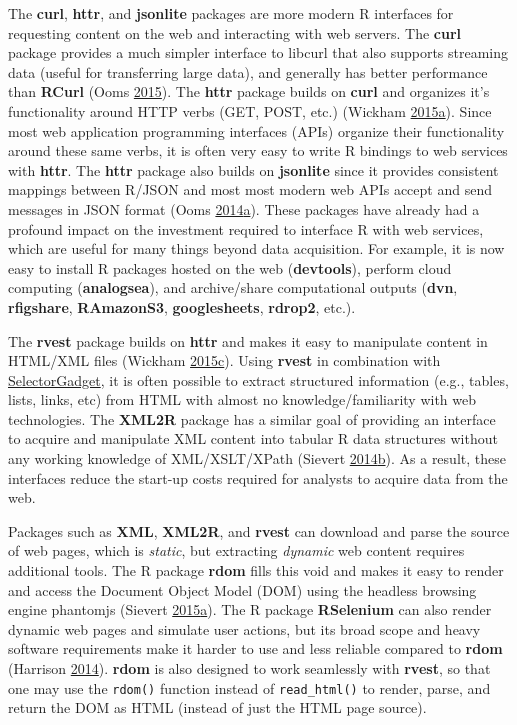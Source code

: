\documentclass[12pt,]{isuthesis}
\begin{document}
The \textbf{curl}, \textbf{httr}, and \textbf{jsonlite} packages are
more modern R interfaces for requesting content on the web and
interacting with web servers. The \textbf{curl} package provides a much
simpler interface to libcurl that also supports streaming data (useful
for transferring large data), and generally has better performance than
\textbf{RCurl} (Ooms \protect\hyperlink{ref-curl}{2015}). The
\textbf{httr} package builds on \textbf{curl} and organizes it's
functionality around HTTP verbs (GET, POST, etc.) (Wickham
\protect\hyperlink{ref-httr}{2015}\protect\hyperlink{ref-httr}{a}).
Since most web application programming interfaces (APIs) organize their
functionality around these same verbs, it is often very easy to write R
bindings to web services with \textbf{httr}. The \textbf{httr} package
also builds on \textbf{jsonlite} since it provides consistent mappings
between R/JSON and most most modern web APIs accept and send messages in
JSON format (Ooms
\protect\hyperlink{ref-jsonlite}{2014}\protect\hyperlink{ref-jsonlite}{a}).
These packages have already had a profound impact on the investment
required to interface R with web services, which are useful for many
things beyond data acquisition. For example, it is now easy to install R
packages hosted on the web (\textbf{devtools}), perform cloud computing
(\textbf{analogsea}), and archive/share computational outputs
(\textbf{dvn}, \textbf{rfigshare}, \textbf{RAmazonS3},
\textbf{googlesheets}, \textbf{rdrop2}, etc.).

The \textbf{rvest} package builds on \textbf{httr} and makes it easy to
manipulate content in HTML/XML files (Wickham
\protect\hyperlink{ref-rvest}{2015}\protect\hyperlink{ref-rvest}{c}).
Using \textbf{rvest} in combination with
\href{http://selectorgadget.com/}{SelectorGadget}, it is often possible
to extract structured information (e.g., tables, lists, links, etc) from
HTML with almost no knowledge/familiarity with web technologies. The
\textbf{XML2R} package has a similar goal of providing an interface to
acquire and manipulate XML content into tabular R data structures
without any working knowledge of XML/XSLT/XPath (Sievert
\protect\hyperlink{ref-Sievert:2014a}{2014}\protect\hyperlink{ref-Sievert:2014a}{b}).
As a result, these interfaces reduce the start-up costs required for
analysts to acquire data from the web.

Packages such as \textbf{XML}, \textbf{XML2R}, and \textbf{rvest} can
download and parse the source of web pages, which is \emph{static}, but
extracting \emph{dynamic} web content requires additional tools. The R
package \textbf{rdom} fills this void and makes it easy to render and
access the Document Object Model (DOM) using the headless browsing
engine phantomjs (Sievert
\protect\hyperlink{ref-rdom}{2015}\protect\hyperlink{ref-rdom}{a}). The
R package \textbf{RSelenium} can also render dynamic web pages and
simulate user actions, but its broad scope and heavy software
requirements make it harder to use and less reliable compared to
\textbf{rdom} (Harrison \protect\hyperlink{ref-RSelenium}{2014}).
\textbf{rdom} is also designed to work seamlessly with \textbf{rvest},
so that one may use the \texttt{rdom()} function instead of
\texttt{read\_html()} to render, parse, and return the DOM as HTML
(instead of just the HTML page source).
\end{document}

